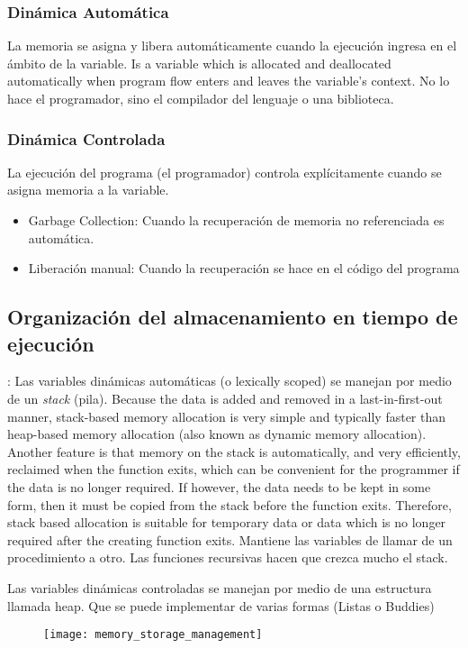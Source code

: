 \documentclass[a4paper, twoside]{article}
\begin{document}
\subsubsection{Dinámica Automática}
La memoria se asigna y libera automáticamente cuando la ejecución ingresa en el ámbito de la variable.
Is a variable which is allocated and deallocated automatically when program flow enters and leaves the variable's context. No lo hace el programador, sino el compilador del lenguaje o una biblioteca.

\subsubsection{Dinámica Controlada}
La ejecución del programa (el programador) controla explícitamente cuando se asigna memoria a la variable.
\begin{itemize}
	\item Garbage Collection: Cuando la recuperación de memoria no referenciada es automática.
	\item Liberación manual: Cuando la recuperación se hace en el código del programa
\end{itemize}

\subsection{Organización del almacenamiento en tiempo de ejecución}:
Las variables dinámicas automáticas (o lexically scoped) se manejan por medio de un \emph{stack} (pila). 
Because the data is added and removed in a last-in-first-out manner, stack-based memory allocation is very simple and typically faster than heap-based memory allocation (also known as dynamic memory allocation). Another feature is that memory on the stack is automatically, and very efficiently, reclaimed when the function exits, which can be convenient for the programmer if the data is no longer required. If however, the data needs to be kept in some form, then it must be copied from the stack before the function exits. Therefore, stack based allocation is suitable for temporary data or data which is no longer required after the creating function exits. 
Mantiene las variables de llamar de un procedimiento a otro.
Las funciones recursivas hacen que crezca mucho el stack.

Las variables dinámicas controladas se manejan por medio de una estructura llamada heap. Que se puede implementar de varias formas (Listas o Buddies)

\begin{figure}[H]
	\centering
	\texttt{[image: memory\_storage\_management]}
	\label{fig:memory_storage_management}
\end{figure}
\end{document}
